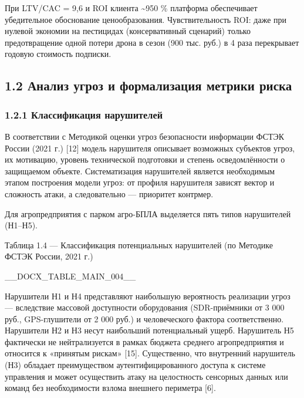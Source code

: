\documentclass[14pt,a4paper]{extarticle}
\begin{document}
При LTV/CAC = 9,6 и ROI клиента \textasciitilde950 \% платформа обеспечивает убедительное обоснование ценообразования. Чувствительность ROI: даже при нулевой экономии на пестицидах (консервативный сценарий) только предотвращение одной потери дрона в сезон (900 тыс. руб.) в 4 раза перекрывает годовую стоимость подписки.


\hypertarget{ux430ux43dux430ux43bux438ux437-ux443ux433ux440ux43eux437-ux438-ux444ux43eux440ux43cux430ux43bux438ux437ux430ux446ux438ux44f-ux43cux435ux442ux440ux438ux43aux438-ux440ux438ux441ux43aux430}{%
\subsection{1.2 Анализ угроз и формализация метрики риска}\label{ux430ux43dux430ux43bux438ux437-ux443ux433ux440ux43eux437-ux438-ux444ux43eux440ux43cux430ux43bux438ux437ux430ux446ux438ux44f-ux43cux435ux442ux440ux438ux43aux438-ux440ux438ux441ux43aux430}}

\hypertarget{ux43aux43bux430ux441ux441ux438ux444ux438ux43aux430ux446ux438ux44f-ux43dux430ux440ux443ux448ux438ux442ux435ux43bux435ux439}{%
\subsubsection{1.2.1 Классификация нарушителей}\label{ux43aux43bux430ux441ux441ux438ux444ux438ux43aux430ux446ux438ux44f-ux43dux430ux440ux443ux448ux438ux442ux435ux43bux435ux439}}

В соответствии с Методикой оценки угроз безопасности информации ФСТЭК России (2021 г.) {[}12{]} модель нарушителя описывает возможных субъектов угроз, их мотивацию, уровень технической подготовки и степень осведомлённости о защищаемом объекте. Систематизация нарушителей является необходимым этапом построения модели угроз: от профиля нарушителя зависят вектор и сложность атаки, а следовательно --- приоритет контрмер.

Для агропредприятия с парком агро-БПЛА выделяется пять типов нарушителей (Н1--Н5).

Таблица 1.4 --- Классификация потенциальных нарушителей (по Методике ФСТЭК России, 2021 г.)



__DOCX_TABLE_MAIN_004__



Нарушители Н1 и Н4 представляют наибольшую вероятность реализации угроз --- вследствие массовой доступности оборудования (SDR-приёмники от 3 000 руб., GPS-глушители от 2 000 руб.) и человеческого фактора соответственно. Нарушители Н2 и Н3 несут наибольший потенциальный ущерб. Нарушитель Н5 фактически не нейтрализуется в рамках бюджета среднего агропредприятия и относится к «принятым рискам» {[}15{]}. Существенно, что внутренний нарушитель (Н3) обладает преимуществом аутентифицированного доступа к системе управления и может осуществить атаку на целостность сенсорных данных или команд без необходимости взлома внешнего периметра {[}6{]}.
\end{document}
